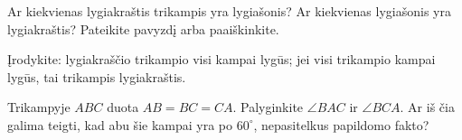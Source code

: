 \documentclass[12pt,a4paper,reqno]{amsart}
\theoremstyle{plain}\newtheorem{theorem}{Teorema}[section]
\theoremstyle{definition}
\theoremstyle{remark}\newtheorem{remark}[theorem]{Pastaba}\newtheorem*{remark*}{Pastaba}
\theoremstyle{definition}\newtheorem*{problem*}{Uždavinys}
\begin{document}
\begin{problem}\label{uzd:lygiakrastis-supratimas-01} Ar kiekvienas lygiakraštis trikampis yra lygiašonis? Ar kiekvienas lygiašonis yra lygiakraštis? Pateikite pavyzdį arba paaiškinkite. \end{problem}
\begin{anchorproblem}\label{atr:lygiakrastis-kampai} Įrodykite: lygiakraščio trikampio visi kampai lygūs; jei visi trikampio kampai lygūs, tai trikampis lygiakraštis. \end{anchorproblem}
\begin{problem}\label{uzd:lygiakrastis-kampai-01} Trikampyje $ABC$ duota $AB=BC=CA$. Palyginkite $\angle BAC$ ir $\angle BCA$. Ar iš čia galima teigti, kad abu šie kampai yra po $60^\circ$, nepasitelkus papildomo fakto? \end{problem}
\end{document}
